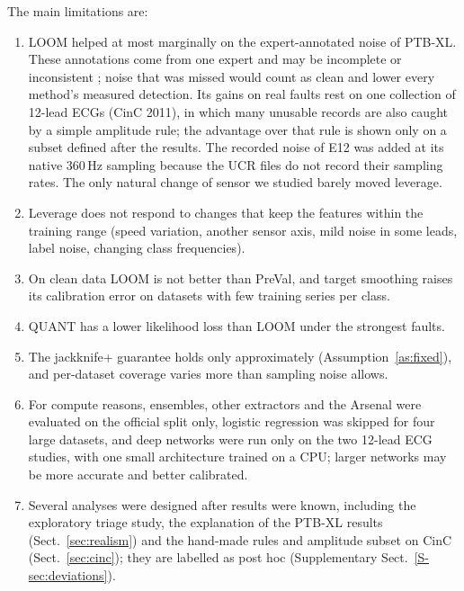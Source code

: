 \documentclass[preprint,12pt,authoryear]{elsarticle}
\begin{document}
The main limitations are:
\begin{enumerate}
\item LOOM helped at most marginally on the expert-annotated noise of PTB-XL. These annotations come from one expert and may be incomplete or inconsistent \citep{han2025diffusion}; noise that was missed would count as clean and lower every method's measured detection. Its gains on real faults rest on one collection of 12-lead ECGs (CinC 2011), in which many unusable records are also caught by a simple amplitude rule; the advantage over that rule is shown only on a subset defined after the results. The recorded noise of E12 was added at its native 360\,Hz sampling because the UCR files do not record their sampling rates. The only natural change of sensor we studied barely moved leverage.
\item Leverage does not respond to changes that keep the features within the training range (speed variation, another sensor axis, mild noise in some leads, label noise, changing class frequencies).
\item On clean data LOOM is not better than PreVal, and target smoothing raises its calibration error on datasets with few training series per class.
\item QUANT has a lower likelihood loss than LOOM under the strongest faults.
\item The jackknife+ guarantee holds only approximately (Assumption~\ref{as:fixed}), and per-dataset coverage varies more than sampling noise allows.
\item For compute reasons, ensembles, other extractors and the Arsenal were evaluated on the official split only, logistic regression was skipped for four large datasets, and deep networks were run only on the two 12-lead ECG studies, with one small architecture trained on a CPU; larger networks may be more accurate and better calibrated.
\item Several analyses were designed after results were known, including the exploratory triage study, the explanation of the PTB-XL results (Sect.~\ref{sec:realism}) and the hand-made rules and amplitude subset on CinC (Sect.~\ref{sec:cinc}); they are labelled as post hoc (Supplementary Sect.~\ref{S-sec:deviations}).
\end{enumerate}

\end{document}
